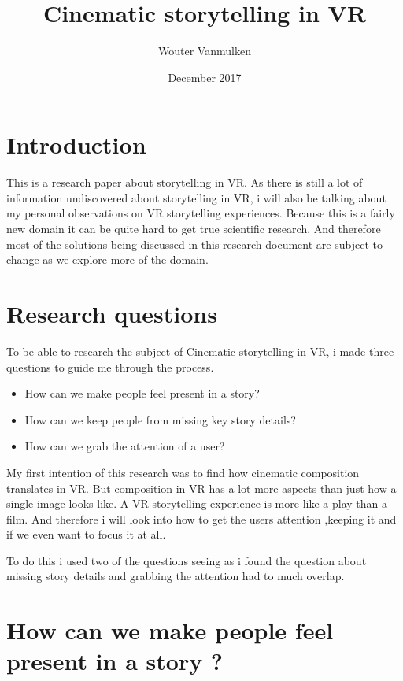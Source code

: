 \documentclass{report}
\title{Cinematic storytelling in VR}
\author{Wouter Vanmulken}
\date{December 2017}
\begin{document}
			
				\maketitle
				\tableofcontents
				\newpage
		
				\chapter{Introduction}
				
				This is a research paper about storytelling in VR. As there is still a lot of information undiscovered about storytelling in VR, i will also be talking about my personal observations on VR storytelling experiences. Because this is a fairly new domain it can be quite hard to get true scientific research. And therefore most of the solutions being discussed in this research document are subject to change as we explore more of the domain.
				
				\chapter{Research questions}
		
				To be able to research the subject of Cinematic storytelling in VR, i made three questions to guide me through the process.
				\begin{itemize}
					\item How can we make people feel present in a story?
					\item How can we keep people from missing key story details?
					\item How can we grab the attention of a user?
				\end{itemize}

				My first intention of this research was to find how cinematic composition translates in VR. But composition in VR has a lot more aspects than just how a single image looks like. A VR storytelling experience is more like a play than a film. And therefore i will look into how to get the users attention ,keeping it and if we even want to focus it at all.
				
				To do this i used two of the questions seeing as i found the question about missing story details and grabbing the attention had to much overlap.
				
				
				

				
				\chapter{How can we make people feel present in a story ?}
				
\end{document}
